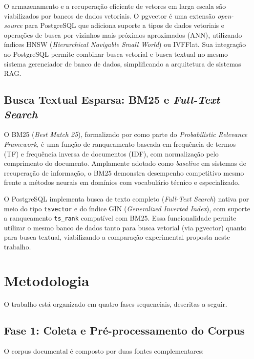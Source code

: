 \documentclass[
  12pt,
  openright,
  twoside,
  a4paper,
  brazil
]{abntex2}
\begin{document}
O armazenamento e a recuperação eficiente de vetores em larga escala são viabilizados por bancos de dados vetoriais. O pgvector \cite{pgvector2021} é uma extensão \textit{open-source} para PostgreSQL que adiciona suporte a tipos de dados vetoriais e operações de busca por vizinhos mais próximos aproximados (ANN), utilizando índices HNSW (\textit{Hierarchical Navigable Small World}) ou IVFFlat. Sua integração ao PostgreSQL permite combinar busca vetorial e busca textual no mesmo sistema gerenciador de banco de dados, simplificando a arquitetura de sistemas RAG.

\section{Busca Textual Esparsa: BM25 e \textit{Full-Text Search}}

O BM25 (\textit{Best Match 25}), formalizado por  como parte do \textit{Probabilistic Relevance Framework}, é uma função de ranqueamento baseada em frequência de termos (TF) e frequência inversa de documentos (IDF), com normalização pelo comprimento do documento. Amplamente adotado como \textit{baseline} em sistemas de recuperação de informação, o BM25 demonstra desempenho competitivo mesmo frente a métodos neurais em domínios com vocabulário técnico e especializado.

O PostgreSQL implementa busca de texto completo (\textit{Full-Text Search}) nativa por meio do tipo \texttt{tsvector} e do índice GIN (\textit{Generalized Inverted Index}), com suporte a ranqueamento \texttt{ts\_rank} compatível com BM25. Essa funcionalidade permite utilizar o mesmo banco de dados tanto para busca vetorial (via pgvector) quanto para busca textual, viabilizando a comparação experimental proposta neste trabalho.

\chapter{Metodologia}

O trabalho está organizado em quatro fases sequenciais, descritas a seguir.

\section{Fase 1: Coleta e Pré-processamento do Corpus}

O corpus documental é composto por duas fontes complementares:
\end{document}
